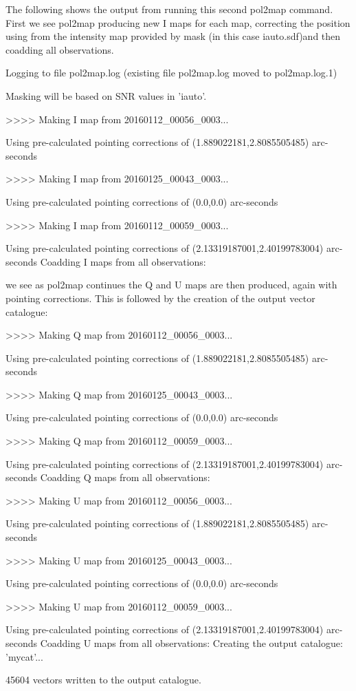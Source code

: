 The following shows the output from running this second pol2map command. First we see pol2map producing
new I maps for each map, correcting the position using from the intensity map provided by mask (in this case iauto.sdf)and then coadding all observations. 

\begin{terminalv}
Logging to file pol2map.log
(existing file pol2map.log moved to pol2map.log.1)

Masking will be based on SNR values in 'iauto'.

>>>>   Making I map from 20160112_00056_0003...

   Using pre-calculated pointing corrections of (1.889022181,2.8085505485) arc-seconds

>>>>   Making I map from 20160125_00043_0003...

   Using pre-calculated pointing corrections of (0.0,0.0) arc-seconds

>>>>   Making I map from 20160112_00059_0003...

   Using pre-calculated pointing corrections of (2.13319187001,2.40199783004) arc-seconds
Coadding I maps from all observations:
\end{terminalv}

we see as pol2map continues the Q and U maps are then produced, again with pointing corrections. This is followed by the creation of
the output vector catalogue:

\begin{terminalv}
>>>>   Making Q map from 20160112_00056_0003...

   Using pre-calculated pointing corrections of (1.889022181,2.8085505485) arc-seconds

>>>>   Making Q map from 20160125_00043_0003...

   Using pre-calculated pointing corrections of (0.0,0.0) arc-seconds

>>>>   Making Q map from 20160112_00059_0003...

   Using pre-calculated pointing corrections of (2.13319187001,2.40199783004) arc-seconds
Coadding Q maps from all observations:

>>>>   Making U map from 20160112_00056_0003...

   Using pre-calculated pointing corrections of (1.889022181,2.8085505485) arc-seconds

>>>>   Making U map from 20160125_00043_0003...

   Using pre-calculated pointing corrections of (0.0,0.0) arc-seconds

>>>>   Making U map from 20160112_00059_0003...

   Using pre-calculated pointing corrections of (2.13319187001,2.40199783004) arc-seconds
Coadding U maps from all observations:
Creating the output catalogue: 'mycat'...

45604 vectors written to the output catalogue.
\end{terminalv}


